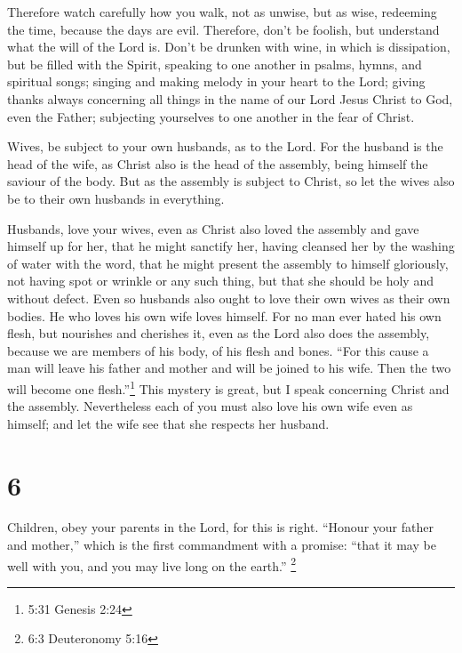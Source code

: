  Therefore watch carefully how you walk, not as unwise, but
as wise,  redeeming the time, because the days are evil.
 Therefore, don't be foolish, but understand what the will
of the Lord is.  Don't be drunken with wine, in which is
dissipation, but be filled with the Spirit,  speaking to
one another in psalms, hymns, and spiritual songs; singing and making
melody in your heart to the Lord;  giving thanks always
concerning all things in the name of our Lord Jesus Christ to God, even
the Father;  subjecting yourselves to one another in the
fear of Christ.

 Wives, be subject to your own husbands, as to the Lord.
 For the husband is the head of the wife, as Christ also is
the head of the assembly, being himself the saviour of the body.
 But as the assembly is subject to Christ, so let the wives
also be to their own husbands in everything.

 Husbands, love your wives, even as Christ also loved the
assembly and gave himself up for her,  that he might
sanctify her, having cleansed her by the washing of water with the word,
 that he might present the assembly to himself gloriously,
not having spot or wrinkle or any such thing, but that she should be
holy and without defect.  Even so husbands also ought to
love their own wives as their own bodies. He who loves his own wife
loves himself.  For no man ever hated his own flesh, but
nourishes and cherishes it, even as the Lord also does the assembly,
 because we are members of his body, of his flesh and
bones.  ``For this cause a man will leave his father and
mother and will be joined to his wife. Then the two will become one
flesh.''\footnote{5:31 Genesis 2:24}  This mystery is
great, but I speak concerning Christ and the assembly. 
Nevertheless each of you must also love his own wife even as himself;
and let the wife see that she respects her husband.

\hypertarget{section-5}{%
\section{6}\label{section-5}}

 Children, obey your parents in the Lord, for this is right.
 ``Honour your father and mother,'' which is the first
commandment with a promise:  ``that it may be well with you,
and you may live long on the earth.'' \footnote{6:3 Deuteronomy 5:16}

